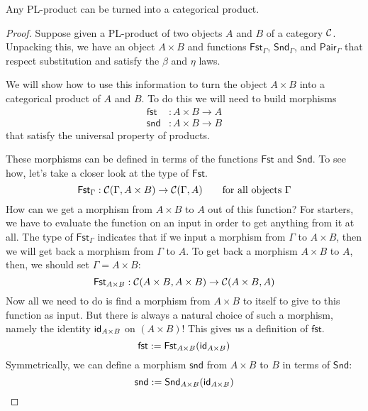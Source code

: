 
\begin{construction} \label{cons:pl-prod-to-prod}
  Any PL-product can be turned into a categorical product.
\end{construction}
\begin{proof}
  Suppose given a PL-product of two objects \(A\) and \(B\) of a category \(\mathcal C\).
  Unpacking this, we have an object \(A \times B\)
  and functions \(\mathsf{Fst}_\Gamma\), \(\mathsf{Snd}_\Gamma\), and \(\mathsf{Pair}_\Gamma\)
  that respect substitution and satisfy the \(\beta\) and \(\eta\) laws.

  We will show how to use this information to turn the object \(A \times B\)
  into a categorical product of \(A\) and \(B\).
  To do this we will need to build morphisms
  \begin{align*}
  \mathsf{fst} &: A \times B \to A\\
  \mathsf{snd} &: A \times B \to B
  \end{align*}
  that satisfy the universal property of products.

  These morphisms can be defined in terms of the functions \(\mathsf{Fst}\) and \(\mathsf{Snd}\).
  To see how, let's take a closer look at the type of \(\mathsf{Fst}\).
  \[
    \mathsf{Fst}_\Gamma : \mathcal C(\Gamma, A\times B) \to \mathcal C(\Gamma, A)
    \qquad\text{for all objects \(\Gamma\)}
  \]
  How can we get a morphism from \(A \times B\) to \(A\) out of this function?
  For starters, we have to evaluate the function on an input in order to get anything from it at all.
  The type of \(\mathsf{Fst}_\Gamma\) indicates that if we input a morphism from \(\Gamma\) to \(A \times B\),
  then we will get back a morphism from \(\Gamma\) to \(A\).
  To get back a morphism \(A \times B\) to \(A\), then, we should set \(\Gamma = A \times B\):
  \[
    \mathsf{Fst}_{A\times B}: \mathcal C(A \times B, A\times B) \to \mathcal C(A \times B, A)
  \]
  Now all we need to do is find a morphism from \(A \times B\) to itself to give
  to this function as input. But there is always a natural choice of such a morphism, namely the identity \(\mathsf{id}_{A\times B}\) on \((A \times B)\)!
  This gives us a definition of \(\mathsf{fst}\).
  \[
    \mathsf{fst} := \mathsf{Fst}_{A\times B}(\mathsf{id}_{A\times B})
  \]
  Symmetrically, we can define a morphism \(\mathsf{snd}\) from \(A \times B\) to \(B\)
  in terms of \(\mathsf{Snd}\):
  \[
    \mathsf{snd} := \mathsf{Snd}_{A\times B}(\mathsf{id}_{A\times B})
  \]


\end{proof}
